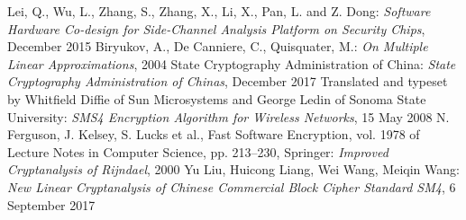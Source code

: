 \newpage
\renewcommand\refname{Bibliografia}

\begin{thebibliography}{99}
 Lei, Q., Wu, L., Zhang, S., Zhang, X., Li, X., Pan, L. and Z. Dong:
\emph{Software Hardware Co-design for Side-Channel Analysis Platform on Security Chips},
December 2015
 Biryukov, A., De Canniere, C., Quisquater, M.:
\emph{On Multiple Linear Approximations},
2004
 State Cryptography Administration of China:
\emph{State Cryptography Administration of Chinas},
December 2017
 Translated and typeset by Whitfield Diffie of Sun Microsystems
and George Ledin of Sonoma State University: \emph{SMS4 Encryption Algorithm for Wireless Networks},
15 May 2008
 N. Ferguson, J. Kelsey, S. Lucks et al., Fast Software Encryption, vol. 1978 of Lecture
Notes in Computer Science, pp. 213–230, Springer: \emph{Improved Cryptanalysis of Rijndael},
2000
 Yu Liu, Huicong Liang, Wei Wang, Meiqin Wang: \emph{New Linear Cryptanalysis of Chinese Commercial Block Cipher
Standard SM4},
6 September 2017
\end{thebibliography}

